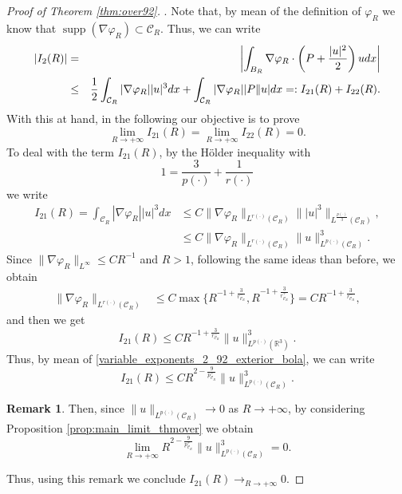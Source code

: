 \documentclass[a4paper,12pt]{amsart}
\theoremstyle{definition}
\newtheorem{remark}{Remark}[section]
\theoremstyle{plain}
\def\R{\mathbb{R}}
\renewcommand{\phi}{\varphi}
\let\phi\varphi
\def\R{\mathbb R}
\def\vu{ u }
\def\vn{ \nabla }
\def\supp{\operatorname{supp}}
\begin{document}
\begin{proof}[Proof of Theorem \ref{thm:over92}]
. Note that, by mean of  the definition of $\phi_R$ we know that $\supp( \vn \phi_R)\subset \mathcal{C}_R $. Thus, we can write 
\begin{eqnarray}
\left|I_2(R)\right|&=&\left|\int_{B_R} \vn \phi_R \cdot \left(P+\frac{|\vu|^2}{2}\right) \vu dx\right|\notag\\
& \leq &\frac{1}{2}  
\int_{ \mathcal{C}_R }|\vn \phi_R||\vu|^3dx + \int_{ \mathcal{C}_R }|\vn \phi_R||P \| \vu| dx 
=: I_{21}(R)+I_{22}(R)
.\label{aug_31T1_92_exterior_bola}
\end{eqnarray}
With this at hand, in the following our objective is to prove 
$$
\displaystyle \lim_{R\to +\infty}I_{21}(R)= \lim_{R\to +\infty} I_{22}(R)=0.
$$
To deal with the term $I_{21}(R)$, by the H\"older inequality with 
\begin{equation}\label{variable_exponents_2_92_exterior_bola}
1=\frac{3}{p(\cdot)}+\frac{1}{r(\cdot)}
\end{equation}
we write 
\begin{align}
I_{21}(R)=\int_{ \mathcal{C}_R }|\vn \phi_R||\vu|^3dx 
&\leq C
\|\vn\phi_R \|_{L^{ r(\cdot)}( \mathcal{C}_R )}\| |\vu|^3 \|_{L^{\frac{p(\cdot)}{3}}( \mathcal{C}_R )},
\\
&\leq C\|\vn\phi_R \|_{L^{ r(\cdot)}( \mathcal{C}_R )}\|\vu \|_{L^{p(\cdot)}( \mathcal{C}_R )}^3.\label{2mayeq3T1_92_exterior_bola}
\end{align}
Since $ \|\vn \phi_R  \|_{L^{\infty}}\leq CR^{-1}$ and $R>1$, following the same ideas than before, we obtain  
\begin{align}
\| \vn \phi_R \|_{L^{r(\cdot)}( \mathcal{C}_R )}
&\leq
 C\max \{R^{-1+\frac 3{r_{ \mathcal{C}_R }^-}}, R^{-1+\frac 3 {r_{ \mathcal{C}_R }^+}}\} 
=
 C R^{-1+\frac 3{r_{ \mathcal{C}_R }^-}}
 ,
  \label{EstimationBeta1C_92_exterior_bola}
\end{align}
and then we get 
\begin{equation}\label{estimateI21_92_exterior_bola}
I_{21}(R)\leq 
  C R^{-1+\frac 3{r_{ \mathcal{C}_R }^-}}
\|\vu \|_{L^{p(\cdot)}(\R^3 )}^3. 
\end{equation}
Thus, by mean of \eqref{variable_exponents_2_92_exterior_bola}, we can write 
\begin{equation}\label{estimateI2122_92_exterior_bola}
I_{21}(R)\leq 
  C R^{2-\frac 9{p_{ \mathcal{C}_R }^+}}
\|\vu \|_{L^{p(\cdot)}(  \mathcal{C}_R  )}^3. 
\end{equation}
\begin{remark}\label{remark_92_exterior_bola_2}
Then, since  
$\|\vu\|_{L^{p(\cdot)}(  \mathcal{C}_R  )}\to 0$ as  $R\to +\infty$, by considering Proposition \ref{prop:main_limit_thmover} we obtain
$$\lim_{R\to +\infty} R^{2-\frac 9{p_{ \mathcal{C}_R }^+}}
\|\vu \|_{L^{p(\cdot)}(  \mathcal{C}_R  )}^3 = 0.$$
\end{remark}
\noindent Thus, using this remark we conclude  $
I_{21}(R) \to_{R\to +\infty} 0. $



\end{proof}
\end{document}
